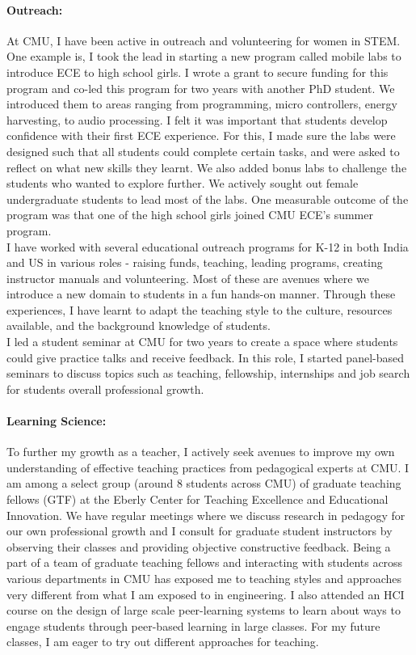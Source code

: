 \documentclass[10pt]{article}
\begin{document}
 \paragraph{Outreach: } 
 At CMU, I have been active in outreach and volunteering for women in STEM. %
One example is, I took the lead in starting a new program called mobile labs to introduce ECE to high school girls. I wrote a grant to secure funding for this program and co-led this program for two years with another PhD student. We introduced them to areas ranging from programming, micro controllers, energy harvesting, to audio processing. I felt it was important that students develop confidence with their first ECE experience. For this, I made sure the labs were designed such that all students could complete certain tasks, and were asked to reflect on what new skills they learnt. We also added bonus labs to challenge the students who wanted to explore further. We actively sought out female undergraduate students to lead most of the labs. One measurable outcome of the program was that one of the high school girls joined CMU ECE's summer program. \\

I have worked with several educational outreach programs for K-12 in both India and US in various roles - raising funds, teaching, leading programs, creating instructor manuals and volunteering. Most of these are avenues where we introduce a new domain to students in a fun hands-on manner. Through these experiences, I have learnt to adapt the teaching style to the culture, resources available, and the background knowledge of students. \\

I led a student seminar at CMU for two years to create a space where students could give practice talks and receive feedback. In this role, I started panel-based seminars to discuss topics such as teaching, fellowship, internships and job search for students overall professional growth. 

\paragraph{Learning Science: }To further my growth as a teacher, I actively seek avenues to improve my own understanding of effective teaching practices from pedagogical experts at CMU. I am among a select group (around 8 students across CMU) of graduate teaching fellows (GTF) at the Eberly Center for Teaching Excellence and Educational Innovation. We have regular meetings where we discuss research in pedagogy for our own professional growth and I consult for graduate student instructors by observing their classes and providing objective constructive feedback. Being a part of a team of graduate teaching fellows and interacting with students across various departments in CMU has exposed me to teaching styles and approaches very different from what I am exposed to in engineering. I also attended an HCI course on the design of large scale peer-learning systems to learn about ways to engage students through peer-based learning in large classes. For my future classes, I am eager to try out different approaches for teaching. %



\small


\end{document}
